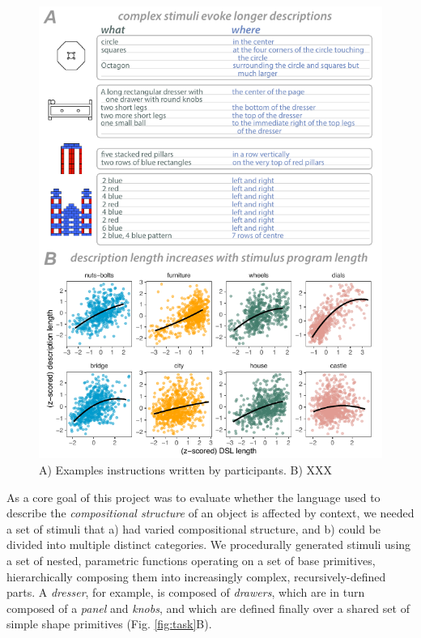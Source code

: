 \documentclass[10pt,letterpaper]{article}
\begin{document}
\begin{figure}
  \begin{center}
  \includegraphics[width=0.99\linewidth]{figures/lax_description_length.pdf}
  \caption{A) Examples instructions written by participants. B) XXX}
  \label{fig:words}
  \end{center}
\end{figure}



As a core goal of this project was to evaluate whether the language used to describe the \textit{compositional structure} of an object is affected by context, we needed a set of stimuli that a) had varied compositional structure, and b) could be divided into multiple distinct categories. 
We procedurally generated stimuli using a set of nested, parametric functions operating on a set of base primitives, hierarchically composing them into increasingly complex, recursively-defined parts.
A \textit{dresser}, for example, is composed of \textit{drawers}, which are in turn composed of a \textit{panel} and \textit{knobs}, and which are defined finally over a shared set of simple shape primitives (Fig. \ref{fig:task}B).
\end{document}
